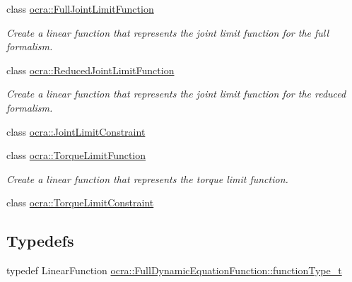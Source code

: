 \begin{DoxyCompactItemize}
class \hyperlink{classocra_1_1FullJointLimitFunction}{ocra\+::\+Full\+Joint\+Limit\+Function}
\begin{DoxyCompactList}\small\item\em Create a linear function that represents the joint limit function for the full formalism. \end{DoxyCompactList}\item 
class \hyperlink{classocra_1_1ReducedJointLimitFunction}{ocra\+::\+Reduced\+Joint\+Limit\+Function}
\begin{DoxyCompactList}\small\item\em Create a linear function that represents the joint limit function for the reduced formalism. \end{DoxyCompactList}\item 
class \hyperlink{classocra_1_1JointLimitConstraint}{ocra\+::\+Joint\+Limit\+Constraint}
\item 
class \hyperlink{classocra_1_1TorqueLimitFunction}{ocra\+::\+Torque\+Limit\+Function}
\begin{DoxyCompactList}\small\item\em Create a linear function that represents the torque limit function. \end{DoxyCompactList}\item 
class \hyperlink{classocra_1_1TorqueLimitConstraint}{ocra\+::\+Torque\+Limit\+Constraint}
\end{DoxyCompactItemize}
\subsection*{Typedefs}
\begin{DoxyCompactItemize}
\item 
typedef Linear\+Function \hyperlink{group__constraint_ga3f72eb3c4529d2c19ef39928f5e57262}{ocra\+::\+Full\+Dynamic\+Equation\+Function\+::function\+Type\+\_\+t}
\end{DoxyCompactItemize}
